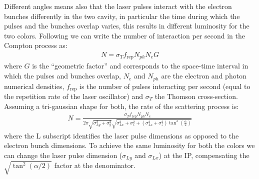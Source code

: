 Different angles means also that the laser pulses interact with the electron bunches differently in the two cavity, in particular the time during which the pulses and the bunches overlap varies, this results in different luminosity for the two colors. Following \parencite{Variola2011} we can write the number of interaction per second in the Compton process as:
\begin{align}
N = \sigma_T f_\mathrm{rep} N_{ph} N_e G
\end{align}
where $G$ is the ``geometric factor'' and corresponds to the space-time interval in which the pulses and bunches overlap, $N_e$ and $N_{ph}$ are the electron and photon numerical densities, $f_\mathrm{rep}$ is the number of pulses interacting per second (equal to the repetition rate of the laser oscillator) and $\sigma_T$ the Thomson cross-section. Assuming a tri-gaussian shape for both, the rate of the scattering process is:
\begin{align}
N = \frac{\sigma_T f_\mathrm{rep} N_{ph} N_e}{2\pi\sqrt{\sigma_{Ly}^2+\sigma_{y}^2}\sqrt{\sigma_{Lx}^2+\sigma_{x}^2+\left(\sigma_{Lz}^2+\sigma_{z}^2\right)\tan^2(\frac{\alpha}{2})}}
\label{eq:N}
\end{align}
where the L subscript identifies the laser pulse dimensions as opposed to the electron bunch dimensions. To achieve the same luminosity for both the colors we can change the laser pulse dimension ($\sigma_{Ly}$ and $\sigma_{Lx}$) at the IP, compensating the $\sqrt{\tan^2(\alpha/2)}$ factor at the denominator.

